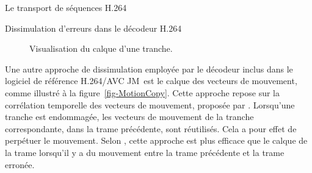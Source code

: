 \documentclass[letterpaper, twoside, 12pt,memoire]{thETS}
\newcommand{\fig}[1]{figure~\ref{#1}}
\newcommand{\ltCodec}{logiciel de référence H.264/AVC JM}
\begin{document}
\begin{chapter}{Le transport de séquences H.264}
\begin{section}{Dissimulation d'erreurs dans le décodeur H.264}
\begin{figure}[htb]
{\begin{varwidth}{\textwidth}
\end{varwidth}}
\caption{ Visualisation du calque d'une tranche.}
\label{fig-FrameCopy}
\end{figure}

Une autre approche de dissimulation employée par le décodeur inclus dans le
\ltCodec~est le calque des vecteurs de mouvement, comme illustré à la
\fig{fig-MotionCopy}. Cette approche repose sur la corrélation temporelle des
vecteurs de mouvement, proposée par \citet{Wu2006}. Lorsqu'une tranche est
endommagée, les vecteurs de mouvement de la tranche correspondante, dans la
trame précédente, sont réutilisés. Cela a pour effet de perpétuer le
mouvement. Selon \citeauthor{Wu2006}, cette approche est plus efficace que le
calque de la trame lorsqu'il y a du mouvement entre la trame précédente et la
trame erronée.

\begin{figure}[htb]
\end{figure}
\end{section}
\end{chapter}
\end{document}
